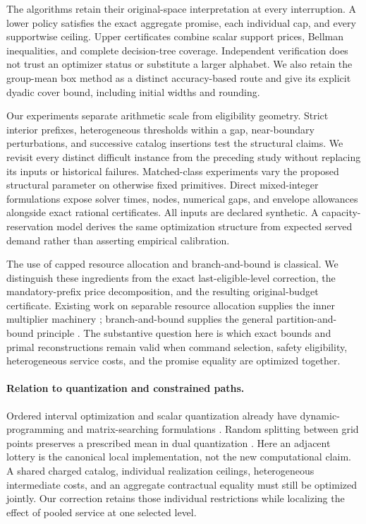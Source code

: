 The algorithms retain their original-space interpretation at every interruption. A lower policy satisfies the exact aggregate promise, each individual cap, and every supportwise ceiling. Upper certificates combine scalar support prices, Bellman inequalities, and complete decision-tree coverage. Independent verification does not trust an optimizer status or substitute a larger alphabet. We also retain the group-mean box method as a distinct accuracy-based route and give its explicit dyadic cover bound, including initial widths and rounding.

Our experiments separate arithmetic scale from eligibility geometry. Strict interior prefixes, heterogeneous thresholds within a gap, near-boundary perturbations, and successive catalog insertions test the structural claims. We revisit every distinct difficult instance from the preceding study without replacing its inputs or historical failures. Matched-class experiments vary the proposed structural parameter on otherwise fixed primitives. Direct mixed-integer formulations expose solver times, nodes, numerical gaps, and envelope allowances alongside exact rational certificates. All inputs are declared synthetic. A capacity-reservation model derives the same optimization structure from expected served demand rather than asserting empirical calibration.

The use of capped resource allocation and branch-and-bound is classical. We distinguish these ingredients from the exact last-eligible-level correction, the mandatory-prefix price decomposition, and the resulting original-budget certificate. Existing work on separable resource allocation supplies the inner multiplier machinery \citep{PatrikssonStromberg2015,SchootUiterkamp2022}; branch-and-bound supplies the general partition-and-bound principle \citep{LawlerWood1966}. The substantive question here is which exact bounds and primal reconstructions remain valid when command selection, safety eligibility, heterogeneous service costs, and the promise equality are optimized together.

\paragraph{Relation to quantization and constrained paths.}
Ordered interval optimization and scalar quantization already have dynamic-programming and matrix-searching formulations \citep{Wu1991,NielsenNock2014}. Random splitting between grid points preserves a prescribed mean in dual quantization \citep{PagesWilbertz2012}. Here an adjacent lottery is the canonical local implementation, not the new computational claim. A shared charged catalog, individual realization ceilings, heterogeneous intermediate costs, and an aggregate contractual equality must still be optimized jointly. Our correction retains those individual restrictions while localizing the effect of pooled service at one selected level.


